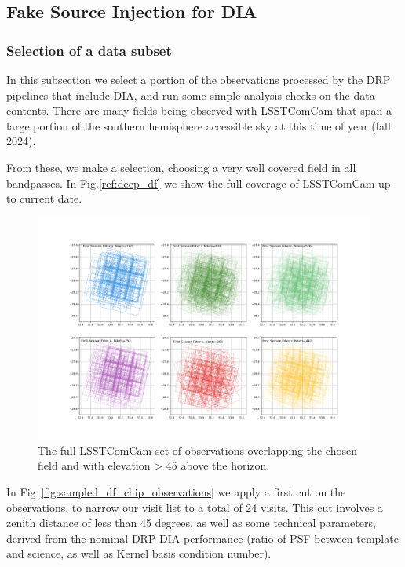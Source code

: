 \subsection{Fake Source Injection for DIA}
\subsubsection{Selection of a data subset}

In this subsection we select a portion of the observations processed by the DRP pipelines that include DIA, and run some simple analysis checks on the data contents. There are many fields being observed with LSSTComCam that span a large portion of the southern hemisphere accessible sky at this time of year (fall 2024).

From these, we make a selection, choosing a very well covered field in all bandpasses. In Fig.\ref{ref:deep_df} we show the full coverage of LSSTComCam up to current date.

\begin{figure}
    \centering
    \includegraphics[width=0.95\linewidth]{dia/figures/deep_df_chip_observations.png}
    \caption{The full LSSTComCam set of observations overlapping the chosen field and with elevation > 45 above the horizon.}
    \label{fig:deep_df}
    
\end{figure}

In Fig~\ref{fig:sampled_df_chip_observations} we apply a first cut on the observations, to narrow our visit list to a total of 24 visits. This cut involves a zenith distance of less than 45 degrees, as well as some technical parameters, derived from the nominal DRP DIA performance (ratio of PSF between template and science, as well as Kernel basis condition number). 

